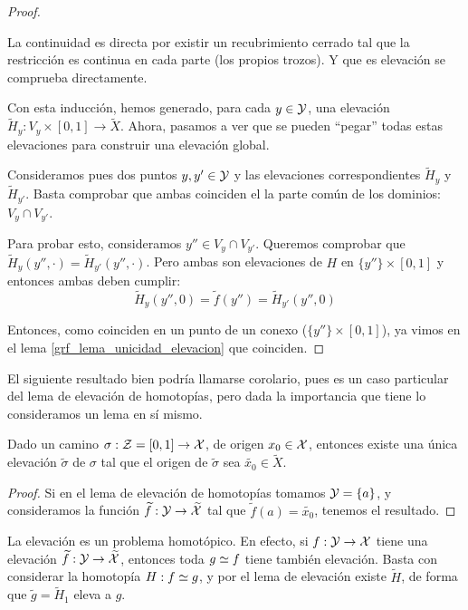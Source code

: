\begin{lem}
\begin{proof}
\begin{itemize}
			La continuidad es directa por existir un recubrimiento cerrado tal que la restricción es continua en cada parte (los propios trozos). Y que es elevación se comprueba directamente.
		\end{itemize}
	
		Con esta inducción, hemos generado, para cada $y\in\mathcal{Y}$, una elevación $\widetilde{H}_y:V_y\times [0,1]\to\widetilde{X}$. Ahora, pasamos a ver que se pueden ``pegar'' todas estas elevaciones para construir una elevación global. 
		
		Consideramos pues dos puntos $y,y'\in\mathcal{Y}$ y las elevaciones correspondientes $\widetilde{H}_y$ y $\widetilde{H}_{y'}$. Basta comprobar que ambas coinciden el la parte común de los dominios: $V_y\cap V_{y'}$.
		
		Para probar esto, consideramos $y''\in V_y\cap V_{y'}$. Queremos comprobar que $\widetilde{H}_y(y'',\cdot)=\widetilde{H}_{y'}(y'',\cdot)$. Pero ambas son elevaciones de $H$ en $\{y''\}\times [0,1]$ y entonces ambas deben cumplir:
		\[\widetilde{H}_y(y'',0)=\widetilde{f}(y'')=\widetilde{H}_{y'}(y'',0)\]
		
		Entonces, como coinciden en un punto de un conexo ($\{y''\}\times [0,1]$), ya vimos en el lema \ref{grf_lema_unicidad_elevacion} que coinciden. 
	\end{proof}
\end{lem}

El siguiente resultado bien podría llamarse corolario, pues es un caso particular del lema de elevación de homotopías, pero dada la importancia que tiene lo consideramos un lema en sí mismo.

\begin{lem}
	\label{grf_lema_elevacion_caminos}
	Dado un camino $\sigma:\mathcal{Z}= [0,1]\to\mathcal{X}$, de origen $x_0\in\mathcal{X}$, entonces existe una única elevación $\widetilde{\sigma}$ de $\sigma$ tal que el origen de $\widetilde{\sigma}$ sea $\widetilde{x_0}\in\widetilde{X}$.
	
	\begin{proof}
		Si en el lema de elevación de homotopías tomamos $\mathcal{Y}=\{a\}$, y consideramos la función $\widetilde{f}:\mathcal{Y}\to \widetilde{\mathcal{X}}$ tal que $\widetilde{f}(a)=\widetilde{x_0}$, tenemos el resultado.
	\end{proof}
\end{lem}

\begin{obs}
	La elevación es un problema homotópico. En efecto, si $f:\mathcal{Y}\to\mathcal{X}$ tiene una elevación $\widetilde{f}:\mathcal{Y}\to\widetilde{\mathcal{X}}$, entonces toda $g\mathrel{\smash{\underset{}{\simeq}}} f$ tiene también elevación.  Basta con considerar la homotopía $H:f\mathrel{\smash{\underset{}{\simeq}}} g$, y por el lema de elevación existe $\widetilde{H}$, de forma que $\widetilde{g} = \widetilde{H}_1$ eleva a $g$.
\end{obs}


